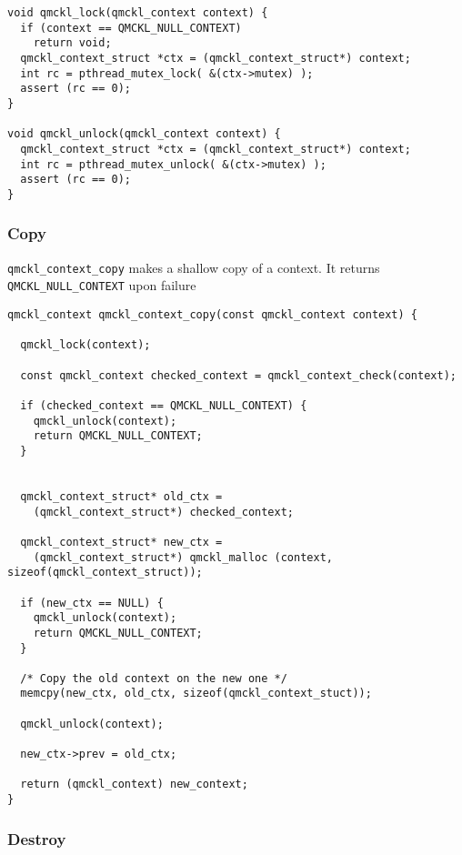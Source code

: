 \begin{verbatim}
void qmckl_lock(qmckl_context context) {
  if (context == QMCKL_NULL_CONTEXT)
    return void;
  qmckl_context_struct *ctx = (qmckl_context_struct*) context;
  int rc = pthread_mutex_lock( &(ctx->mutex) );
  assert (rc == 0);
}

void qmckl_unlock(qmckl_context context) {
  qmckl_context_struct *ctx = (qmckl_context_struct*) context;
  int rc = pthread_mutex_unlock( &(ctx->mutex) );
  assert (rc == 0);
}
\end{verbatim}

\subsubsection{Copy}
\label{sec:org38bfb02}

\texttt{qmckl\_context\_copy} makes a shallow copy of a context. It returns
\texttt{QMCKL\_NULL\_CONTEXT} upon failure

\begin{verbatim}
qmckl_context qmckl_context_copy(const qmckl_context context) {

  qmckl_lock(context);

  const qmckl_context checked_context = qmckl_context_check(context);

  if (checked_context == QMCKL_NULL_CONTEXT) {
    qmckl_unlock(context);
    return QMCKL_NULL_CONTEXT;
  }

  
  qmckl_context_struct* old_ctx =
    (qmckl_context_struct*) checked_context;

  qmckl_context_struct* new_ctx =
    (qmckl_context_struct*) qmckl_malloc (context, sizeof(qmckl_context_struct));

  if (new_ctx == NULL) {
    qmckl_unlock(context);
    return QMCKL_NULL_CONTEXT;
  }

  /* Copy the old context on the new one */
  memcpy(new_ctx, old_ctx, sizeof(qmckl_context_stuct));

  qmckl_unlock(context);
  
  new_ctx->prev = old_ctx;

  return (qmckl_context) new_context;
}

\end{verbatim}
\subsubsection{Destroy}
\label{sec:org55cdc30}

